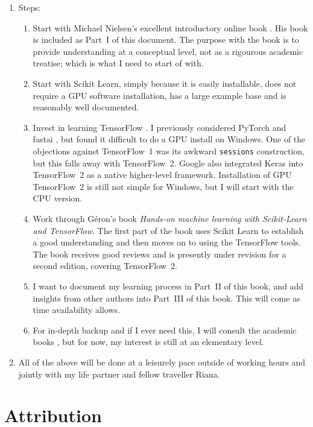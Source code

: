 \begin{enumerate}
\item Steps:
\begin{enumerate}
\item Start with Michael Nielsen's excellent introductory online book \cite{Nielsen2015}. His book is included as Part~I of this document.  The purpose with the book is to provide understanding at a conceptual level, not as a rigourous academic treatise; which is what I need to start of with.
\item Start with Scikit Learn, simply because it is easily installable, does not require a \ac{GPU} software installation, has a large example base and is reasonably well documented.
\item Invest in learning TensorFlow \cite{TensorFlow2Alpha2019}.  I previously considered PyTorch \cite{paszkePyTorch2017,PyTorch2019} and fastai \cite{fastai2019}, but found it difficult to do a GPU install on Windows.  One of the objections against TensorFlow~1 was its awkward \lstinline{sessions}  construction, but this falls away with TensorFlow~2.  Google also integrated Keras \cite{cholletkeras2015,cholletkerasio2015} into TensorFlow~2 as a native higher-level framework.
    Installation of GPU TensorFlow~2 is still not simple for Windows, but I will start with the \ac{CPU} version.
\item Work through G\'{e}ron's book \cite{geron2017handson} \textit{Hands-on machine learning with Scikit-Learn and TensorFlow}.  The first part of the book uses Scikit Learn to establish a good understanding and then moves on to using the TensorFlow tools.
    The book receives good reviews and is presently under revision for a second edition, covering TensorFlow~2.
\item I want to document my learning process in Part~II of this book, and add insights from other authors into Part~III of this book. This will come as time availability allows.
\item For in-depth backup and if I ever need this, I will consult the academic books \cite{geron2017handson,Webb2002statpatn,Michie94,theodoridis2003,Duda2001,Bishop1995,Bishop2006,Goodfellow2016}, but for now, my interest is still at an elementary level.
\end{enumerate}
\item All of the above will be done at a leisurely pace outside of working hours and jointly with my life partner and fellow traveller Riana.
\end{enumerate}


\section*{Attribution}

